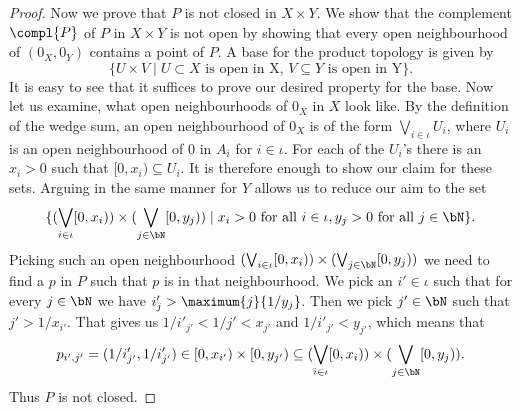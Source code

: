 \begin{proof}
    Now we prove that $P$ is not closed in $X \times Y$. 
    We show that the complement $\compl{P}$ of $P$ in $X \times Y$ is not open by showing that every open neighbourhood of $(0_X, 0_Y)$ contains a point of $P$. 
    A base for the product topology is given by 
    \[\{ U \times V \mid U \subset X \text{ is open in X, } V \subseteq Y \text{ is open in Y}\}. \]
    It is easy to see that it suffices to prove our desired property for the base.
    Now let us examine, what open neighbourhoods of $0_X$ in $X$ look like. 
    By the definition of the wedge sum, an open neighbourhood of $0_X$ is of the form $\bigvee_{i \in \iota}U_i$, where $U_i$ is an open neighbourhood of $0$ in $A_i$ for $i \in \iota$. 
    For each of the $U_i$'s there is an $x_i > 0$ such that $[0, x_i) \subseteq U_i$. 
    It is therefore enough to show our claim for these sets. 
    Arguing in the same manner for $Y$ allows us to reduce our aim to the set 
    \[\{(\bigvee_{i \in \iota}[0, x_i)) \times (\bigvee_{j \in \bN}[0, y_j)) \mid x_i > 0 \text{ for all } i \in \iota, y_j > 0 \text{ for all } j \in \bN\}.\] 
    Picking such an open neighbourhood $(\bigvee_{i \in \iota}[0, x_i)) \times (\bigvee_{j \in \bN}[0, y_j))$ we need to find a $p$ in $P$ such that $p$ is in that neighbourhood.
    We pick an $i' \in \iota$ such that for every $j \in \bN$ we have $i'_j > \maximum{j}{1/y_j}$. 
    Then we pick $j' \in \bN$ such that $j' > 1/x_{i'}$. 
    That gives us $1/i'_{j'} < 1/j' < x_{j'}$ and $1/i'_{j'} < y_{j'}$, which means that 
    \[p_{i', j'} = (1/i'_{j'}, 1/i'_{j'}) \in [0, x_{i'}) \times [0, y_{j'}) \subseteq (\bigvee_{i \in \iota}[0, x_i)) \times (\bigvee_{j \in \bN}[0, y_j)).\]
    Thus $P$ is not closed. 
\end{proof}